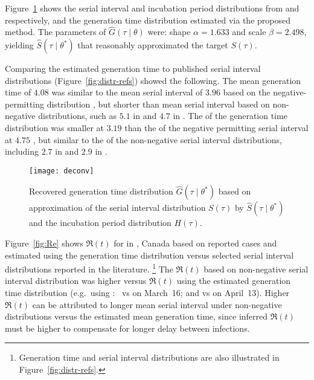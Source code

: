 Figure~\ref{fig:deconv} shows the
serial interval and incubation period distributions
from \citep{Du2020} and \citep{Lauer2020} respectively,
and the generation time distribution estimated via the proposed method.
The \mle parameters of $\hat{G}(\tau\mid\theta)$ were:
shape ${\alpha = 1.633}$ and scale ${\beta = 2.498}$,
yielding $\hat{S}(\tau\mid\theta^*)$
that reasonably approximated the target $S(\tau)$.
\par
Comparing the estimated generation time to published serial interval distributions
(Figure~\ref{fig:distr-refs}) showed the following.
The mean generation time of $4.08$ was similar to
the mean serial interval of $3.96$
based on the negative-permitting distribution \citep{Du2020},
but shorter than mean serial interval based on non-negative distributions,
such as $5.1$ in \citep{Zhang2020} and $4.7$ in \citep{Nishiura2020}.
The \sd of the generation time distribution was smaller at $3.19$
than the \sd of the negative permitting serial interval at $4.75$ \citep{Du2020},
but similar to the \sd of the non-negative serial interval distributions,
including $2.7$ in \citep{Zhang2020} and $2.9$ in \citep{Nishiura2020}.
\par
\begin{figure}
  \centering
  \texttt{[image: deconv]}
  \caption{Recovered generation time distribution
    $\hat{G}(\tau\mid\theta^*)$
    based on \mle approximation of the serial interval distribution
    $S(\tau)$ by $\hat{S}(\tau\mid\theta^*)$
    and the incubation period distribution $H(\tau)$.}
  \label{fig:deconv}
\end{figure}
\par
Figure~\ref{fig:Re} shows
$\Re(t)$ for \covid in \gta, Canada
based on reported cases and estimated using
the generation time distribution versus
selected serial interval distributions reported in the literature.%
\footnote{Generation time and serial interval distributions
  are also illustrated in Figure~\ref{fig:distr-refs}.}
The $\Re(t)$ based on non-negative serial interval distribution was higher
versus $\Re(t)$ using the estimated generation time distribution
(e.g.\ using \citep{Zhang2020}:\
 vs
 on March~16; and
 vs
 on April~13).
Higher $\Re(t)$ can be attributed to
longer mean serial interval under non-negative distributions
versus the estimated mean generation time,
since inferred $\Re(t)$ must be higher
to compensate for longer delay between infections.%
